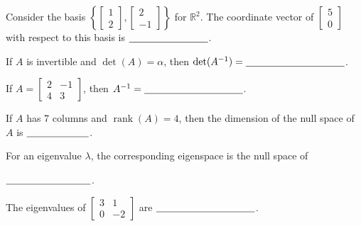 \documentclass[12pt,a4paper,answers,addpoints]{exam}
\begin{document}
\begin{questions}
\addpoints

\newpage
{}
\vspace{0.4cm}

\question[2]
Consider the basis
$\left\{\begin{bmatrix}1\\2\end{bmatrix},
\begin{bmatrix}2\\-1\end{bmatrix}\right\}$ for $\mathbb R^2$.
The coordinate vector of $\begin{bmatrix}5\\0\end{bmatrix}$ with respect to this basis is
$\underline{\hspace{28mm}}$.

\question[2]
If $A$ is invertible and $\det(A)=\alpha$, then $\det(A^{-1})=\underline{\hspace{35mm}}$.

\question[2]
If $A=\begin{bmatrix}2&-1\\4&3\end{bmatrix}$, then
$A^{-1}=\underline{\hspace{35mm}}$.

\question[2]
If $A$ has 7 columns and $\operatorname{rank}(A)=4$, then the dimension of the
null space of $A$ is $\underline{\hspace{22mm}}$.

\question[2]
For an eigenvalue $\lambda$, the corresponding eigenspace is the null space of
\par\hspace*{8mm}$\underline{\hspace{30mm}}$.

\question[2]
The eigenvalues of $\begin{bmatrix}3&1\\0&-2\end{bmatrix}$ are
$\underline{\hspace{35mm}}$.


\end{questions}
\end{document}
